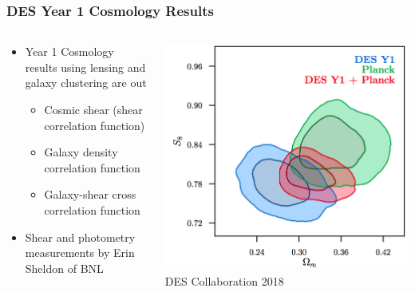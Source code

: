 \documentclass[aspectratio=169]{beamer}
\begin{document}
\frame
{

    \frametitle{DES Year 1 Cosmology Results}


    \begin{columns}
        \begin{column}{0.5\textwidth}
            \begin{itemize}

                \item Year 1 Cosmology results using lensing and galaxy clustering are out
                    \begin{itemize}
                        \item Cosmic shear (shear correlation function)
                        \item Galaxy density correlation function
                        \item Galaxy-shear cross correlation function
                    \end{itemize}

                \item Shear and photometry measurements by Erin Sheldon of BNL

            \end{itemize}

        \end{column}
        \begin{column}{0.5\textwidth}
            \centering
                \includegraphics[width=\linewidth]{3x2-fig10.png}
                \newline
                {\tiny DES Collaboration 2018}
        \end{column}

    \end{columns}

}
\end{document}
